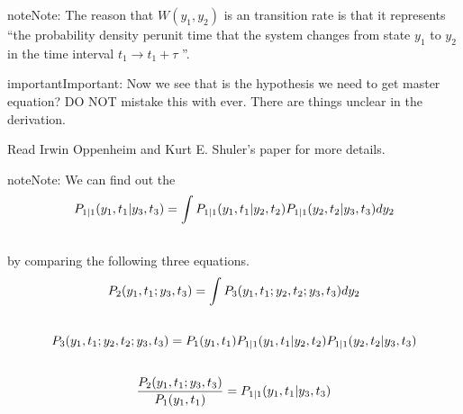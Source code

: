 \documentclass[letterpaper,10pt,english]{sphinxmanual}
\begin{document}
\begin{notice}{note}{Note:}
The reason that $W(y_1,y_2)$ is an transition rate is that it represents ``the probability density perunit time that the system changes from state $y_1$ to $y_2$ in the time interval $t_1\rightarrow t_1 +\tau$ ''. \footnotemark[1]
\end{notice}

\begin{notice}{important}{Important:}
Now we see that  is the hypothesis we need to get master equation? DO NOT mistake this with  ever. There are things unclear in the derivation.

Read Irwin Oppenheim and Kurt E. Shuler's paper for more details. \footnotemark[2]
\end{notice}

\begin{notice}{note}{Note:}
We can find out the 
\begin{gather}
\begin{split}P_{1|1}(y_1,t_1|y_3,t_3) = \int P _{1|1}(y_1,t_1|y_2,t_2)P_{1|1}(y_2,t_2|y_3,t_3)dy_2\end{split}\notag\\\begin{split}\end{split}\notag
\end{gather}
by comparing the following three equations.
\begin{gather}
\begin{split}P_2(y_1,t_1;y_3,t_3) = \int P_3(y_1,t_1;y_2,t_2;y_3,t_3) dy_2\end{split}\notag\\\begin{split}\end{split}\notag
\end{gather}\begin{gather}
\begin{split}P_3(y_1,t_1;y_2,t_2;y_3,t_3) = P_1(y_1,t_1) P _{1|1}(y_1,t_1|y_2,t_2) P _{1|1}(y_2,t_2|y_3,t_3)\end{split}\notag\\\begin{split}\end{split}\notag
\end{gather}\begin{gather}
\begin{split}\frac{P_2(y_1,t_1;y_3,t_3)}{P_1(y_1,t_1)} = P_{1|1}(y_1,t_1|y_3,t_3)\end{split}\notag\\\begin{split}\end{split}\notag
\end{gather}\end{notice}
\end{document}
